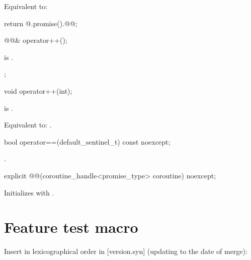 \documentclass{wg21}
\begin{document}
\begin{addedblock}
\begin{itemdescr}
\effects
Equivalent to:
\begin{codeblock}
    return @.promise().@@;
\end{codeblock}
\end{itemdescr}

\begin{itemdecl}
@@& operator++();
\end{itemdecl}

\begin{itemdescr}
\expects
{} is .


\returns {};

\end{itemdescr}
\begin{itemdecl}
void operator++(int);
\end{itemdecl}

\begin{itemdescr}
\expects
{} is .

\effects
Equivalent to: .
\end{itemdescr}

\begin{itemdecl}
bool operator==(default_sentinel_t) const noexcept;
\end{itemdecl}

\begin{itemdescr}
\returns
{}.
\end{itemdescr}

\begin{itemdecl}
explicit @@(coroutine_handle<promise_type> coroutine) noexcept;
\end{itemdecl}

\begin{itemdescr}
\effects
Initializes  with .
\end{itemdescr}

\end{addedblock}


\section{Feature test macro}

\begin{draftnote}
Insert in lexicographical order in [version.syn]
(updating  to the date of merge):
\end{draftnote}
\end{document}
